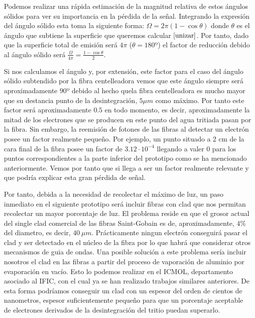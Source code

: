 Podemos realizar una rápida estimación de la magnitud relativa de estos ángulos sólidos para ver su importancia en la pérdida de la señal. Integrando la expresión del ángulo sólido esta toma la siguiente forma: $\Omega=2\pi(1-\cos{\theta})$ donde $\theta$ es el ángulo que subtiene la superficie que queremos calcular$~\cite{unizar}$. Por tanto, dado que la superficie total de emisión será $4\pi$ ($\theta=180º$) el factor de reducción debido al ángulo sólido será $\frac{\Omega}{4\pi}=\frac{1-\cos{\theta}}{2}$. 

Si nos calculamos el ángulo y, por extensión, este factor para el caso del ángulo sólido subtendido por la fibra centelleadora vemos que este ángulo siempre será aproximadamente $90º$ debido al hecho quela fibra centelleadora es mucho mayor que su destancia punto de la desintegración, $5\mu m$ como máximo. Por tanto este factor será aproximadamente $0.5$ en todo momento, es decir, aproximadamente la mitad de los electrones que se producen en este punto del agua tritiada pasan por la fibra. Sin embargo, la reemisión de fotones de las fibras al detectar un electrón posee un factor realmente pequeño. Por ejemplo, un punto situado a 2 cm de la cara final de la fibra posee un factor de $3.12\cdotp 10^{-4}$ llegando a valer $0$ para los puntos correspondientes a la parte inferior del prototipo como se ha mencionado anteriormente. Vemos por tanto que si llega a ser un factor realmente relevante y que podría explicar esta gran pérdida de señal. 

Por tanto, debida a la necesidad de recolectar el máximo de luz, un paso inmediato en el siguiente prototipo será incluir fibras con clad que nos permitan recolectar un mayor porcentaje de luz. El problema reside en que el grosor actual del single clad comercial de las fibras Saint-Gobain es de, aproximadamente, $4\%$ del diametro, es decir, $40~\mu m$. Prácticamente ningun electrón conseguirá pasar el clad y ser detectado en el núcleo de la fibra por lo que habrá que considerar otros mecanismos de guia de ondas. Una posible solución a este problema sería incluir nosotros el clad en las fibras a partir del proceso de vaporación de aluminio por evaporación en vacío. Esto lo podemos realizar en el ICMOL, departamento asociado al IFIC, con el cual ya se han realizado trabajos similares anteriores. De esta forma podríamos conseguir un clad con un espesor del orden de cientos de nanometros, espesor suficientemente pequeño para que un porcentaje aceptable de electrones derivados de la desintegración del tritio puedan superarlo. 